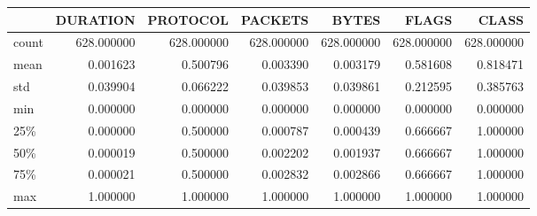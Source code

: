 \begin{tabular}{lrrrrrr}
\toprule
{} &    DURATION &    PROTOCOL &     PACKETS &       BYTES &       FLAGS &       CLASS \\
\midrule
count &  628.000000 &  628.000000 &  628.000000 &  628.000000 &  628.000000 &  628.000000 \\
mean  &    0.001623 &    0.500796 &    0.003390 &    0.003179 &    0.581608 &    0.818471 \\
std   &    0.039904 &    0.066222 &    0.039853 &    0.039861 &    0.212595 &    0.385763 \\
min   &    0.000000 &    0.000000 &    0.000000 &    0.000000 &    0.000000 &    0.000000 \\
25\%   &    0.000000 &    0.500000 &    0.000787 &    0.000439 &    0.666667 &    1.000000 \\
50\%   &    0.000019 &    0.500000 &    0.002202 &    0.001937 &    0.666667 &    1.000000 \\
75\%   &    0.000021 &    0.500000 &    0.002832 &    0.002866 &    0.666667 &    1.000000 \\
max   &    1.000000 &    1.000000 &    1.000000 &    1.000000 &    1.000000 &    1.000000 \\
\bottomrule
\end{tabular}
